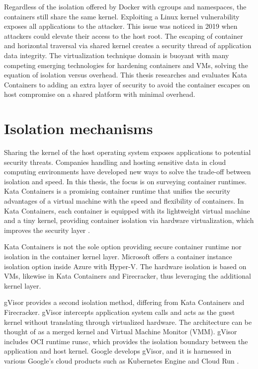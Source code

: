 Regardless of the isolation offered by Docker with cgroups and namespaces, the containers still share the same kernel. Exploiting a Linux kernel vulnerability exposes all applications to the attacker. This issue was noticed in 2019 \cite{CVE-2020-14386}\cite{CVE-2019-5736} when attackers could elevate their access to the host root. The escaping of container and horizontal traversal via shared kernel creates a security thread of application data integrity. The virtualization technique domain is buoyant with many competing emerging technologies for hardening containers and VMs, solving the equation of isolation versus overhead. This thesis researches and evaluates Kata Containers to adding an extra layer of security to avoid the container escapes on host compromise on a shared platform with minimal overhead. \cite{EdgeComputing5G}

\section{Isolation mechanisms}
\label{section:isolation}

Sharing the kernel of the host operating system exposes applications to potential security threats. Companies handling and hosting sensitive data in cloud computing environments have developed new ways to solve the trade-off between isolation and speed. In this thesis, the focus is on surveying container runtimes. Kata Containers is a promising container runtime that unifies the security advantages of a virtual machine with the speed and flexibility of containers. In Kata Containers, each container is equipped with its lightweight virtual machine and a tiny kernel, providing container isolation via hardware virtualization, which improves the security layer \cite{Kumar2020}.

Kata Containers is not the sole option providing secure container runtime nor isolation in the container kernel layer. Microsoft offers a container instance isolation option inside Azure with Hyper-V. The hardware isolation is based on VMs, likewise in Kata Containers and Firecracker, thus leveraging the additional kernel layer. \cite{Hyper-V}

gVisor provides a second isolation method, differing from Kata Containers and Firecracker. gVisor intercepts application system calls and acts as the guest kernel without translating through virtualized hardware. The architecture can be thought of as a merged kernel and Virtual Machine Monitor (VMM). gVisor includes OCI runtime runsc, which provides the isolation boundary between the application and host kernel. Google develops gVisor, and it is harnessed in various Google's cloud products such as Kubernetes Engine \cite{GKE} and Cloud Run \cite{CloudRun}. \cite{Debab2021}\cite{gVisor}

